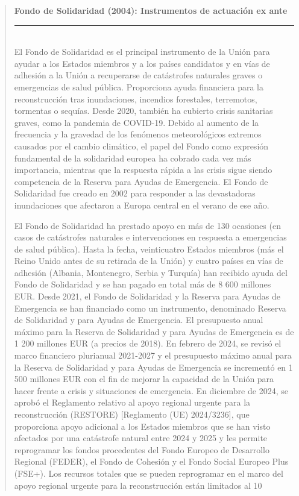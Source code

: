 \documentclass[10pt,a4paper]{article}
\newenvironment{specialblock}[1]{%
      \begin{quote} %
      \small %
      \noindent\textbf{#1}\\[-0.3em] %
      \rule{\linewidth}{0.4pt}\\[0.6em]}{
      \end{quote}}
\begin{document}
\begin{specialblock}{Fondo de Solidaridad (2004): Instrumentos de actuación ex ante}
    El Fondo de Solidaridad es el principal instrumento de la Unión para ayudar a los Estados miembros y a los países candidatos y en vías de adhesión a la Unión a recuperarse de catástrofes naturales graves o emergencias de salud pública. Proporciona ayuda financiera para la reconstrucción tras inundaciones, incendios forestales, terremotos, tormentas o sequías. Desde 2020, también ha cubierto crisis sanitarias graves, como la pandemia de COVID-19. Debido al aumento de la frecuencia y la gravedad de los fenómenos meteorológicos extremos causados por el cambio climático, el papel del Fondo como expresión fundamental de la solidaridad europea ha cobrado cada vez más importancia, mientras que la respuesta rápida a las crisis sigue siendo competencia de la Reserva para Ayudas de Emergencia. El Fondo de Solidaridad fue creado en 2002 para responder a las devastadoras inundaciones que afectaron a Europa central en el verano de ese año.

    El Fondo de Solidaridad ha prestado apoyo en más de 130 ocasiones (en casos de catástrofes naturales e intervenciones en respuesta a emergencias de salud pública). Hasta la fecha, veinticuatro Estados miembros (más el Reino Unido antes de su retirada de la Unión) y cuatro países en vías de adhesión (Albania, Montenegro, Serbia y Turquía) han recibido ayuda del Fondo de Solidaridad y se han pagado en total más de 8 600 millones EUR. Desde 2021, el Fondo de Solidaridad y la Reserva para Ayudas de Emergencia se han financiado como un instrumento, denominado Reserva de Solidaridad y para Ayudas de Emergencia. El presupuesto anual máximo para la Reserva de Solidaridad y para Ayudas de Emergencia es de 1 200 millones EUR (a precios de 2018). En febrero de 2024, se revisó el marco financiero plurianual 2021-2027 y el presupuesto máximo anual para la Reserva de Solidaridad y para Ayudas de Emergencia se incrementó en 1 500 millones EUR con el fin de mejorar la capacidad de la Unión para hacer frente a crisis y situaciones de emergencia. En diciembre de 2024, se aprobó el Reglamento relativo al apoyo regional urgente para la reconstrucción (RESTORE) [Reglamento (UE) 2024/3236], que proporciona apoyo adicional a los Estados miembros que se han visto afectados por una catástrofe natural entre 2024 y 2025 y les permite reprogramar los fondos procedentes del Fondo Europeo de Desarrollo Regional (FEDER), el Fondo de Cohesión y el Fondo Social Europeo Plus (FSE+). Los recursos totales que se pueden reprogramar en el marco del apoyo regional urgente para la reconstrucción están limitados al 10 %


\end{specialblock}
\end{document}

